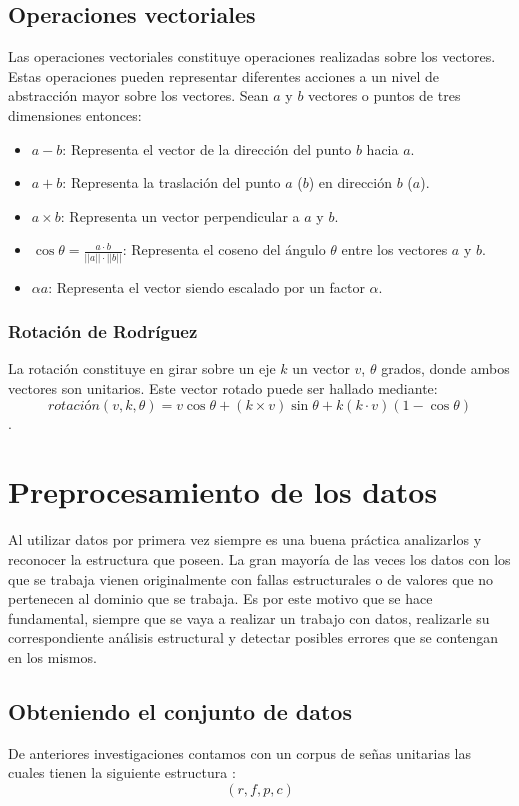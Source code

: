 \subsection{Operaciones vectoriales}

Las operaciones vectoriales constituye operaciones realizadas sobre los vectores. Estas operaciones 
pueden representar diferentes acciones a un nivel de abstracción mayor sobre los vectores. Sean $a$ y
$b$ vectores o puntos de tres dimensiones entonces:

\begin{itemize}
	\item $a - b$: Representa el vector de la dirección del punto $b$ hacia $a$.
	\item $a + b$: Representa la traslación del punto $a$ ($b$) en dirección $b$ ($a$).
	\item $a \times b$: Representa un vector perpendicular a $a$ y $b$.
	\item $\cos \theta = \frac{a \cdot b}{||a|| \cdot ||b||}$: Representa el coseno del ángulo $\theta$
	entre los vectores $a$ y $b$.
	\item $\alpha a$: Representa el vector siendo escalado por un factor $\alpha$.
\end{itemize}

\subsubsection{Rotación de Rodríguez}

La rotación constituye en girar sobre un eje $k$ un vector $v$, $\theta$ grados, donde ambos vectores son 
unitarios. Este vector rotado puede ser hallado mediante:
$$
rotación(v, k, \theta) = v \cos \theta + (k \times v) \sin \theta + k(k \cdot v)(1 - \cos \theta)
$$.


\section{Preprocesamiento de los datos}
Al utilizar datos por primera vez siempre es una buena práctica analizarlos y reconocer la estructura que poseen. La gran mayoría de las veces los datos con los que se trabaja vienen originalmente con fallas estructurales o de valores que no pertenecen al dominio que se trabaja. Es por este motivo que se hace fundamental, siempre que se vaya a realizar un trabajo con datos, realizarle su correspondiente análisis estructural y detectar posibles errores que se contengan en los mismos.
\subsection{Obteniendo el conjunto de datos}
De anteriores investigaciones contamos con un corpus de señas unitarias las cuales tienen la siguiente estructura :
$$
(r,f,p,c)
$$
 
